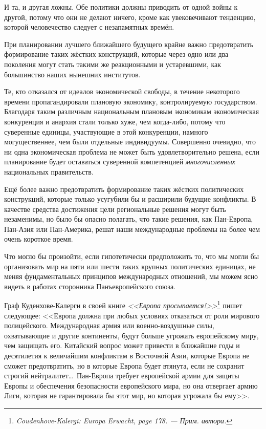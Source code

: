 И та, и другая ложны. Обе политики должны приводить от одной войны к другой, потому что они не делают ничего, кроме как увековечивают тенденцию, которой человечество следует с незапамятных времён.

При планировании лучшего ближайшего будущего крайне важно предотвратить формирование таких жёстких конструкций, которые через одно или два поколения могут стать такими же реакционными и устаревшими, как большинство наших нынешних институтов.

Те, кто отказался от идеалов экономической свободы, в течение некоторого времени пропагандировали плановую экономику, контролируемую государством. Благодаря таким различным национальным плановым экономикам экономическая конкуренция и анархия стали только хуже, чем когда-либо, потому что суверенные единицы, участвующие в этой конкуренции, намного могущественнее, чем были отдельные индивидуумы. Совершенно очевидно, что ни одна экономическая проблема не может быть удовлетворительно решена, если планирование будет оставаться суверенной компетенцией \textit{многочисленных} национальных правительств.

Ещё более важно предотвратить формирование таких жёстких политических конструкций, которые только усугубили бы и расширили будущие конфликты. В качестве средства достижения цели региональные решения могут быть незаменимы, но было бы опасно полагать, что такие решения, как Пан-Европа, Пан-Азия или Пан-Америка, решат наши международные проблемы на более чем очень короткое время.

Что могло бы произойти, если гипотетически предположить то, что мы могли бы организовать мир на пяти или шести таких крупных политических единицах, не меняя фундаментальных принципов международных отношений, мы можем ясно видеть в работах сторонника Панъевропейского союза.

Граф Куденхове-Калерги в своей книге \textit{<<Европа просыпается!>>}\footnote{%
\textit{Coudenhove-Kalergi: Europa Erwacht, page 178. — Прим. автора.}} пишет следующее: <<Европа должна при любых условиях отказаться от роли мирового полицейского. Международная армия или военно-воздушные силы, охватывающие и другие континенты, будут больше угрожать европейскому миру, чем защищать его. Китайский вопрос может привести в ближайшие годы и десятилетия к величайшим конфликтам в Восточной Азии, которые Европа не сможет предотвратить, но в которые Европа будет втянута, если не сохранит строгий нейтралитет\ldots\ Пан-Европа требует европейской армии для защиты Европы и обеспечения безопасности европейского мира, но она отвергает армию Лиги, которая не гарантировала бы этот мир, но которая угрожала бы ему>>.

